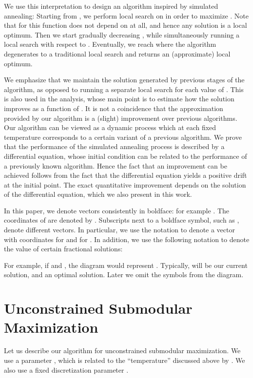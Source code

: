 \documentclass{article}[11pt]
\begin{document}
We use this interpretation to design an algorithm inspired by simulated annealing:
Starting from ,
we perform local search on  in order to maximize .
Note that for  this function does not depend on  at all,
and hence any solution is a local optimum.
Then we start gradually decreasing ,
while simultaneously running a local search with respect to .
Eventually, we reach  where
the algorithm degenerates to a traditional local search and returns an
(approximate) local optimum.

We emphasize that we maintain the solution generated by previous stages
of the algorithm, as opposed to running a separate local search for each value of . 
This is also used in the analysis, whose main point is to estimate
how the solution improves as a function of .
It is not a coincidence that the approximation provided by our algorithm
is a (slight) improvement over previous algorithms. Our algorithm can be viewed
as a dynamic process which at each fixed temperature  corresponds to a certain
variant of a previous algorithm. We prove that the performance of the simulated annealing
process is described by a differential equation, whose initial condition can be
related to the performance of a previously known algorithm. Hence the fact that an improvement
can be achieved follows from the fact that the differential equation yields
a positive drift at the initial point. The exact quantitative improvement depends
on the solution of the differential equation, which we also present in this work.

\medskip
{}
In this paper, we denote vectors consistently in boldface: for example .
The coordinates of  are denoted by . Subscripts next to a boldface
symbol, such as , denote different vectors. In particular, we use the notation
 to denote a vector with coordinates  for  and 
for . 
In addition, we use the following notation to denote the value of
certain fractional solutions:
\vspace{-5pt}

For example, if  and , the diagram would represent .
Typically,  will be our current solution, and  an optimal solution.
Later we omit the symbols  from the diagram.



\section{Unconstrained Submodular Maximization}
\label{sec:unconstrained}

Let us describe our algorithm for unconstrained submodular maximization.
We use a parameter , which is related to the ``temperature''
discussed above by . We also use a fixed discretization parameter .
\end{document}
